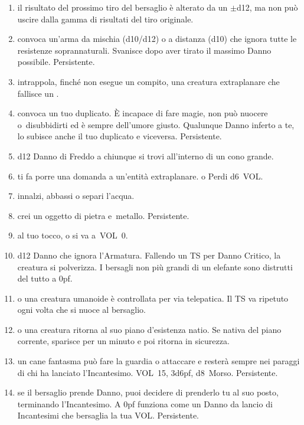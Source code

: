 \documentclass[itdr]{subfiles}
\begin{document}
\begin{enumerate}
	\item {} il risultato del prossimo tiro del bersaglio è alterato da un $\pm$d12, ma non può uscire dalla gamma di risultati del tiro originale.
	\item {} convoca un'arma da mischia (d10/d12) o a distanza (d10) che ignora tutte le resistenze soprannaturali. Svanisce dopo aver tirato il massimo Danno possibile. Persistente.
	\item {} intrappola, finché non esegue un compito, una creatura extraplanare che fallisce un .
	\item {} convoca un tuo duplicato. È incapace di fare magie, non può nuocere o~disubbidirti ed è sempre dell'umore giusto. Qualunque Danno inferto a te, lo subisce anche il tuo duplicato e viceversa. \mbox{Persistente}.
	\item {} d12 Danno di Freddo a chiunque si trovi all'interno di un cono grande.
	\item {} ti fa porre una domanda a un'entità extraplanare.  o Perdi d6~VOL.
	\item {} innalzi, abbassi o separi l'acqua.
	\item {} crei un oggetto di pietra e~metallo. Persistente.
	\item {} al tuo tocco,  o si va a~VOL~0.
	\item {} d12 Danno che ignora l'Armatura. Fallendo un TS per Danno Critico, la creatura si polverizza. I bersagli non più grandi di un elefante sono distrutti del tutto a 0pf.
	\item {}  o una creatura umanoide è controllata per via telepatica. Il TS va ripetuto ogni volta che si nuoce al bersaglio.
	\item {}  o una creatura ritorna al suo piano d'esistenza natio. Se nativa del piano corrente, sparisce per un minuto e poi ritorna in sicurezza.
	\item {} un cane fantasma può fare la guardia o attaccare e resterà sempre nei paraggi di chi ha lanciato l'Incantesimo. VOL~15, 3d6pf, d8~Morso. Persistente.
	\item {} se il bersaglio prende Danno, puoi decidere di prenderlo tu al suo posto, terminando l'Incantesimo. A 0pf funziona come un Danno da lancio di Incantesimi che bersaglia la tua VOL. Persistente.

\end{enumerate}
\end{document}
